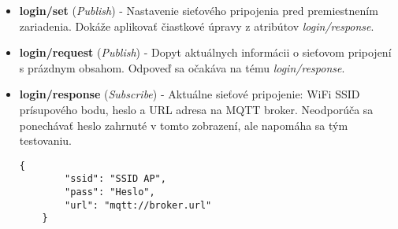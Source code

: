 \begin{itemize}[noitemsep,topsep=0pt]
	Enumerácie sa pretvárajú na reťazce s významom priamo vychádzajúcim z pôvodných konštánt:
	\begin{itemize}[noitemsep, topsep=0pt, label=$\star$]
		\item Dynamický rozsah senzora ,,range'': \verb|"2g"|, \verb|"4g"|, \verb|"8g"|, \verb|"16g"|
		\item Názvy oknových funkcií: \verb|"boxcar"|, \verb|"bartlett"|, \verb|"hann"|, \verb|"hamming"|, \verb|"blackman"|
		\item Transformácie do frekvenčnej domény: \verb|"dft"|, \verb|"dct"|
		\item Algoritmy hľadania špičiek ,,strategy'' sa nazývajú rovnako ako skupiny možností ich parametrov:
		\verb|"threshold"|, \verb|"neighbours"|, \verb|"zero_crossing"|, \verb|"hill_walker"|
		\item Odosielané nespracované údaje (,,logger'') ,,samples'' sú v časovej doméne \verb|"t"|, 
		frekvenčnej doméne \verb|"f"|, alebo nie sú posielané \verb|""|. 
	\end{itemize}
	
	\begin{lstlisting}[style=messages]
	{
		"sensor": {
			"fs": 476,  "range": "2g", 
			"n": 256, "overlap": 0.5, 
			"axis": [true, true, true]
		},
		"tsmooth": {"on": false, "n": 8, "repeat": 1},
		"stats": {
			"min": true, "max": true, "rms": true, 
			"avg": true, "var": true, "std": true, 
			"skew": true, "kurt": true, "med": true,
			"mad": true, "corr": false
		},
		"transform": {"w": "hann", "f": "dft", "log": true},
		"fsmooth": {"on": false, "n": 8, "repeat": 1},
		"peak": {
			"tmin": 4, "tprox": 5, 
			"strategy": "threshold", 
			"threshold": {
				"t": -15.0
			},
			"neighbours": {
				"k": 9, "e": 0.0, "h": -100.0, "h_rel": 10.0
			},
			"zero_crossing": {
				"k": 4, "slope": 3.0
			},
			"hill_walker": {
				"t": 0.0, "h": 0, "p": 10.0, "i": 3.0
			}
		},
		"logger": {
			"local": false, "mqtt": true, 
			"samples": "t", "subsamp": 1,
			"stats": true, "events": true
		}
	}
	\end{lstlisting}
	\item \textbf{login/set}  (\emph{Publish}) - Nastavenie sieťového pripojenia pred premiestnením zariadenia. 
	Dokáže aplikovať čiastkové úpravy z atribútov \emph{login/response}.
	\item \textbf{login/request} (\emph{Publish}) - Dopyt aktuálnych informácii o sieťovom pripojení s prázdnym obsahom.
	 Odpoveď sa očakáva na tému \emph{login/response}.
	\item \textbf{login/response} (\emph{Subscribe}) - Aktuálne sieťové pripojenie: WiFi SSID prísupového bodu, heslo a 
	URL adresa na MQTT broker. Neodporúča sa ponechávať heslo zahrnuté v tomto zobrazení, ale napomáha sa tým testovaniu.
	\begin{lstlisting}[style=messages]
	{
		"ssid": "SSID AP",
		"pass": "Heslo",
		"url": "mqtt://broker.url"
	}
	\end{lstlisting}
\end{itemize}
	

